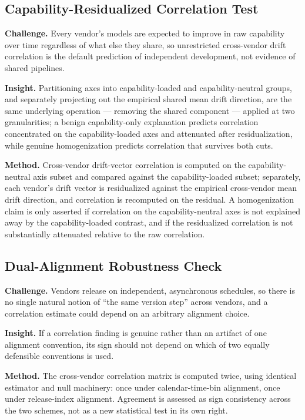 \documentclass[11pt]{article}
\begin{document}
\subsection{Capability-Residualized Correlation Test}
\textbf{Challenge.} Every vendor's models are expected to improve in raw capability over time regardless of what else they share, so unrestricted cross-vendor drift correlation is the default prediction of independent development, not evidence of shared pipelines.

\textbf{Insight.} Partitioning axes into capability-loaded and capability-neutral groups, and separately projecting out the empirical shared mean drift direction, are the same underlying operation --- removing the shared component --- applied at two granularities; a benign capability-only explanation predicts correlation concentrated on the capability-loaded axes and attenuated after residualization, while genuine homogenization predicts correlation that survives both cuts.

\textbf{Method.} Cross-vendor drift-vector correlation is computed on the capability-neutral axis subset and compared against the capability-loaded subset; separately, each vendor's drift vector is residualized against the empirical cross-vendor mean drift direction, and correlation is recomputed on the residual. A homogenization claim is only asserted if correlation on the capability-neutral axes is not explained away by the capability-loaded contrast, and if the residualized correlation is not substantially attenuated relative to the raw correlation.

\subsection{Dual-Alignment Robustness Check}
\textbf{Challenge.} Vendors release on independent, asynchronous schedules, so there is no single natural notion of ``the same version step'' across vendors, and a correlation estimate could depend on an arbitrary alignment choice.

\textbf{Insight.} If a correlation finding is genuine rather than an artifact of one alignment convention, its sign should not depend on which of two equally defensible conventions is used.

\textbf{Method.} The cross-vendor correlation matrix is computed twice, using identical estimator and null machinery: once under calendar-time-bin alignment, once under release-index alignment. Agreement is assessed as sign consistency across the two schemes, not as a new statistical test in its own right.
\end{document}
